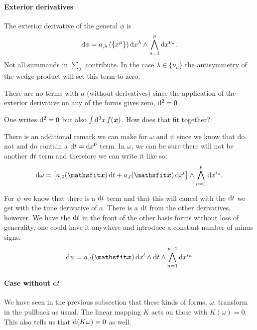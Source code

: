 \documentclass[11pt, english, fleqn, DIV=15, headinclude, BCOR=1cm]{scrartcl}
\begin{document}
\paragraph{Exterior derivatives}

The exterior derivative of the general $\phi$ is
\[
    \mathop{}\!\mathrm d \phi = a_{,\lambda} \left( \{x^\mu\} \right) \mathop{}\!\mathrm d x^\lambda \wedge \bigwedge_{n = 1}^{p} \mathop{}\!\mathrm d x^{\nu_n}.
\]
Not all summands in $\sum_\lambda$ contribute. In the case $\lambda \in
\{\nu_n\}$ the antisymmetry of the wedge product will set this term to zero.

There are no terms with $a$ (without derivatives) since the application of the
exterior derivative on any of the forms gives zero, $\mathop{}\!\mathrm d^2 = 0$.

\begin{question}
    One writes $\mathop{}\!\mathrm d^2 = 0$ but also $\int \mathop{}\!\mathrm d^3x \, f(\boldsymbol{x})$. How does that
    fit together?
\end{question}

There is an additional remark we can make for $\omega$ and $\psi$ since we know
that do not and do contain a $\mathop{}\!\mathrm d t = \mathop{}\!\mathrm d x^0$ term. In $\omega$, we can be
sure there will not be another $\mathop{}\!\mathrm d t$ term and therefore we can write it like
so:
\[
    \dif \omega = \sbr{a_{,0}(\tens x) \dif t +  a_{,l}(\tens x) \dif x^l} \wedge
    \bigwedge_{n = 1}^{p} \dif x^{i_n}.
\]

For $\psi$ we know that there is a $\mathop{}\!\mathrm d t$ term and that this will cancel with
the $\mathop{}\!\mathrm d t$ we get with the time derivative of $a$. There is a $\mathop{}\!\mathrm d t$ from
the other derivatives, however. We have the $\mathop{}\!\mathrm d t$ in the front of the other
basis forms without loss of generality, one could have it anywhere and
introduce a constant number of minus signs.
\[
    \dif \psi = a_{,l}(\tens x) \dif x^l \wedge \dif t \wedge
    \bigwedge_{n = 1}^{p-1} \dif x^{i_n}
\]

\paragraph{Case without $\mathop{}\!\mathrm d t$}

We have seen in the previous subsection that these kinds of forms, $\omega$,
transform in the pullback as usual. The linear mapping $K$ acts on those with
$K(\omega) = 0$. This also tells us that $\mathop{}\!\mathrm d(K \omega) = 0$ as well.
\end{document}
